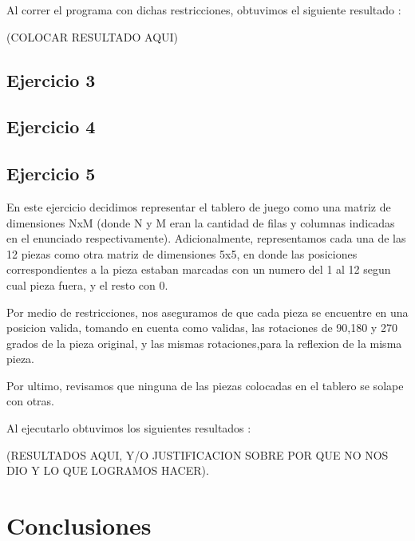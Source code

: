 \documentclass{article}
\begin{document}
Al correr el programa con dichas restricciones, obtuvimos el siguiente resultado : \par


(COLOCAR RESULTADO AQUI) \par

\subsection{Ejercicio 3}
\subsection{Ejercicio 4}
\subsection{Ejercicio 5}


En este ejercicio decidimos representar el tablero de juego como una matriz de dimensiones NxM (donde N y M eran la cantidad de filas y columnas indicadas en el enunciado respectivamente). Adicionalmente, representamos cada una de las 12 piezas como otra matriz de dimensiones 5x5, en donde las posiciones correspondientes a la pieza estaban marcadas con un numero del 1 al 12 segun cual pieza fuera, y el resto con 0. \par


Por medio de restricciones, nos aseguramos de que cada pieza se encuentre en una posicion valida, tomando en cuenta como validas, las rotaciones de 90,180 y 270 grados de la pieza original, y las mismas rotaciones,para la reflexion de la misma pieza. \par


Por ultimo, revisamos que ninguna de las piezas colocadas en el tablero se solape con otras. \par


Al ejecutarlo obtuvimos los siguientes resultados : \par


(RESULTADOS AQUI, Y/O JUSTIFICACION SOBRE POR QUE NO NOS DIO Y LO QUE LOGRAMOS HACER).\par


\clearpage

\section{Conclusiones}
\hspace{0.5cm}



\end{document}
